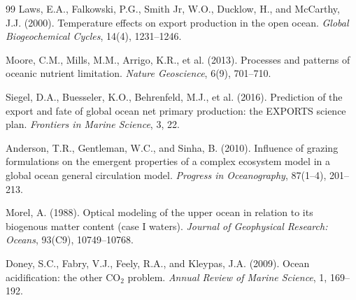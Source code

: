 \documentclass[a4paper, 11pt]{article}
\begin{document}
\begin{thebibliography}{99}
Laws, E.A., Falkowski, P.G., Smith Jr, W.O., Ducklow, H., and McCarthy, J.J. (2000).
Temperature effects on export production in the open ocean.
\textit{Global Biogeochemical Cycles}, 14(4), 1231--1246.

Moore, C.M., Mills, M.M., Arrigo, K.R., et al. (2013).
Processes and patterns of oceanic nutrient limitation.
\textit{Nature Geoscience}, 6(9), 701--710.

Siegel, D.A., Buesseler, K.O., Behrenfeld, M.J., et al. (2016).
Prediction of the export and fate of global ocean net primary production: the EXPORTS science plan.
\textit{Frontiers in Marine Science}, 3, 22.

Anderson, T.R., Gentleman, W.C., and Sinha, B. (2010).
Influence of grazing formulations on the emergent properties of a complex ecosystem model in a global ocean general circulation model.
\textit{Progress in Oceanography}, 87(1--4), 201--213.

Morel, A. (1988).
Optical modeling of the upper ocean in relation to its biogenous matter content (case I waters).
\textit{Journal of Geophysical Research: Oceans}, 93(C9), 10749--10768.

Doney, S.C., Fabry, V.J., Feely, R.A., and Kleypas, J.A. (2009).
Ocean acidification: the other CO$_2$ problem.
\textit{Annual Review of Marine Science}, 1, 169--192.

\end{thebibliography}
\end{document}
